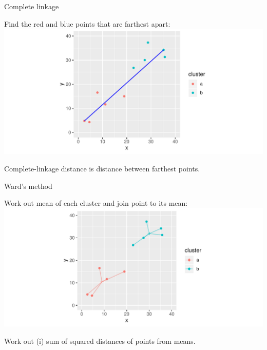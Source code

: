 \documentclass[ignorenonframetext,]{beamer}
\begin{document}
\begin{frame}{Complete linkage}
\protect\hypertarget{complete-linkage}{}

Find the red and blue points that are farthest apart:
\includegraphics{figure/unnamed-chunk-349-1.pdf}

Complete-linkage distance is distance between farthest points.

\end{frame}

\begin{frame}{Ward's method}
\protect\hypertarget{wards-method}{}

Work out mean of each cluster and join point to its mean:
\includegraphics{figure/unnamed-chunk-350-1.pdf}

Work out (i) sum of squared distances of points from means.

\end{frame}
\end{document}
